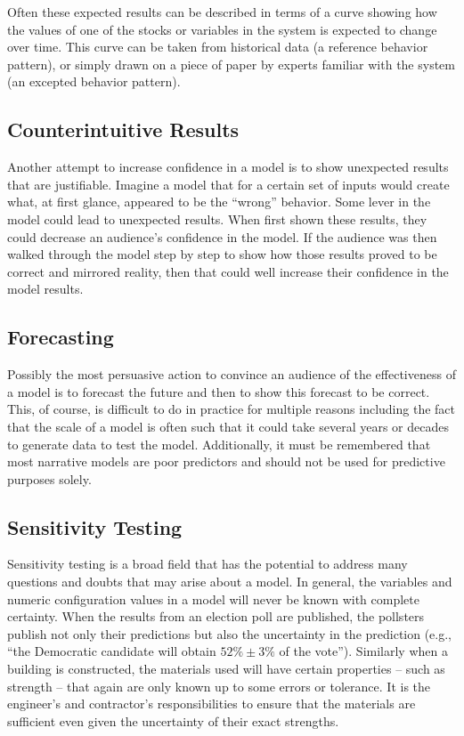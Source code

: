 \documentclass[]{memoir}
\begin{document}
Often these expected results can be described in terms of a curve
showing how the values of one of the stocks or variables in the system
is expected to change over time. This curve can be taken from historical
data (a reference behavior pattern), or simply drawn on a piece of paper
by experts familiar with the system (an excepted behavior pattern).

\subsection{Counterintuitive Results}

Another attempt to increase confidence in a model is to show unexpected
results that are justifiable. Imagine a model that for a certain set of
inputs would create what, at first glance, appeared to be the ``wrong''
behavior. Some lever in the model could lead to unexpected results. When
first shown these results, they could decrease an audience's confidence
in the model. If the audience was then walked through the model step by
step to show how those results proved to be correct and mirrored
reality, then that could well increase their confidence in the model
results.

\subsection{Forecasting}

Possibly the most persuasive action to convince an audience of the
effectiveness of a model is to forecast the future and then to show this
forecast to be correct. This, of course, is difficult to do in practice
for multiple reasons including the fact that the scale of a model is
often such that it could take several years or decades to generate data
to test the model. Additionally, it must be remembered that most
narrative models are poor predictors and should not be used for
predictive purposes solely.

\subsection{Sensitivity Testing}

Sensitivity testing is a broad field that has the potential to address
many questions and doubts that may arise about a model. In general, the
variables and numeric configuration values in a model will never be
known with complete certainty. When the results from an election poll
are published, the pollsters publish not only their predictions but also
the uncertainty in the prediction (e.g., ``the Democratic candidate will
obtain $52\% \pm 3\%$ of the vote''). Similarly when a building is
constructed, the materials used will have certain properties -- such as
strength -- that again are only known up to some errors or tolerance. It
is the engineer's and contractor's responsibilities to ensure that the
materials are sufficient even given the uncertainty of their exact
strengths.
\end{document}
